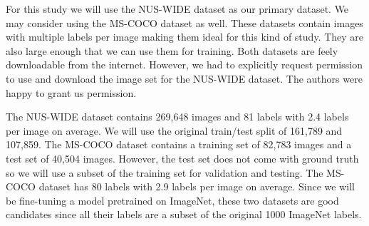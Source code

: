 \documentclass[10pt, a4paper, twocolumn]{article} %
\begin{document}
For this study we will use the NUS-WIDE\citep{nus-wide-civr09} dataset as our primary dataset. We may consider using the MS-COCO\citep{MSCOCO} dataset as well.  
These datasets contain images with multiple labels per image making them ideal for this kind of study.
They are also large enough that we can use them for training.
Both datasets are feely downloadable from the internet.  However, we had to explicitly request permission to use and download the image set for the NUS-WIDE dataset.  The authors were happy to grant us permission.

The NUS-WIDE dataset contains 269,648 images and 81 labels with 2.4 labels per image on average.  We will use the original train/test split of 161,789 and 107,859. The MS-COCO dataset contains a training set of 82,783 images and a test set of 40,504 images.  However, the test set does not come with ground truth so we will use a subset of the training set for validation and testing. The MS-COCO dataset has 80 labels with 2.9 labels per image on average.  
Since we will be fine-tuning a model pretrained on ImageNet, these two datasets are good candidates since all their labels are a subset of the original 1000 ImageNet labels.

\end{document}
